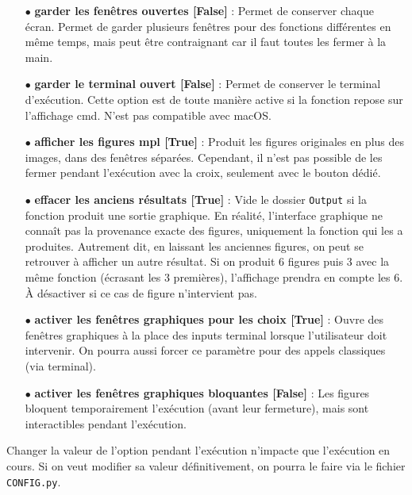 \documentclass[12pt]{article}
\begin{document}
    \begin{enumerate}
        \item[$\bullet$] \textbf{garder les fenêtres ouvertes [False]} : Permet de conserver chaque écran. Permet de garder plusieurs fenêtres pour des fonctions différentes en même temps, mais peut être contraignant car il faut toutes les fermer à la main.

        \item[$\bullet$] \textbf{garder le terminal ouvert [False]} : Permet de conserver le terminal d'exécution. Cette option est de toute manière active si la fonction repose sur l'affichage cmd. N'est pas compatible avec macOS.

        \item[$\bullet$] \textbf{afficher les figures mpl [True]} : Produit les figures originales en plus des images, dans des fenêtres séparées. Cependant, il n'est pas possible de les fermer pendant l'exécution avec la croix, seulement avec le bouton dédié.

        \item[$\bullet$] \textbf{effacer les anciens résultats [True]} : Vide le dossier \texttt{Output} si la fonction produit une sortie graphique. En réalité, l'interface graphique ne connaît pas la provenance exacte des figures, uniquement la fonction qui les a produites. Autrement dit, en laissant les anciennes figures, on peut se retrouver à afficher un autre résultat. Si on produit 6 figures puis 3 avec la même fonction (écrasant les 3 premières), l'affichage prendra en compte les 6. À désactiver si ce cas de figure n'intervient pas.

        \item[$\bullet$] \textbf{activer les fenêtres graphiques pour les choix [True]} : Ouvre des fenêtres graphiques à la place des inputs terminal lorsque l'utilisateur doit intervenir. On pourra aussi forcer ce paramètre pour des appels classiques (via terminal).

        \item[$\bullet$] \textbf{activer les fenêtres graphiques bloquantes [False]} : Les figures bloquent temporairement l'exécution (avant leur fermeture), mais sont interactibles pendant l'exécution.
    \end{enumerate}

    Changer la valeur de l'option pendant l'exécution n'impacte que l'exécution en cours. Si on veut modifier sa valeur définitivement, on pourra le faire via le fichier \texttt{CONFIG.py}.
\end{document}
